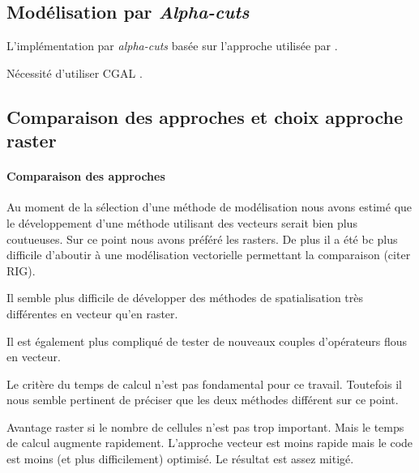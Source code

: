 \subsection{Modélisation par \emph{Alpha-cuts}}

L'implémentation par \emph{alpha-cuts} basée sur l'approche utilisée
par \textcite{Runz2008a,Zoghlami2016}.



Nécessité d'utiliser CGAL \autocite{CGAL2019}.




\subsection{Comparaison des approches et choix approche raster}

\paragraph{Comparaison des approches}


Au moment de la sélection d'une méthode de modélisation nous avons
estimé que le développement d'une méthode utilisant des vecteurs
serait bien plus coutueuses. Sur ce point nous avons préféré les
rasters. De plus il a été bc plus difficile d'aboutir à une
modélisation vectorielle permettant la comparaison (citer RIG).


Il semble plus difficile de développer des méthodes de spatialisation
très différentes en vecteur qu'en raster.

Il est également plus compliqué de tester de nouveaux couples
d'opérateurs flous en vecteur.



Le critère du temps de calcul n'est pas fondamental pour ce
travail. Toutefois il nous semble pertinent de préciser que les deux
méthodes différent sur ce point.

Avantage raster si le nombre de cellules n'est pas trop
important. Mais le temps de calcul augmente rapidement. L'approche
vecteur est moins rapide mais le code est moins (et plus
difficilement) optimisé. Le résultat est assez mitigé.

